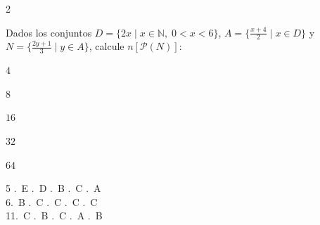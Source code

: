 \begin{multicols}{2}
\vspace{0.3cm}

\ejercicio Dados los conjuntos
$D = \{2x \mid x \in \mathbb{N},\; 0 < x < 6\}$,
$A = \bigl\{\tfrac{x+4}{2} \;\big|\; x \in D\bigr\}$ y
$N = \bigl\{\tfrac{2y+1}{3} \;\big|\; y \in A\bigr\}$,
calcule $n[\mathcal{P}(N)]$:
\begin{alternativas}
  \item $4$
  \item $8$
  \item $16$
  \item $32$
  \item $64$
\end{alternativas}

\end{multicols}

\vspace{0.5cm}
\begin{tcolorbox}[
  enhanced, colback=GrisClaro, colframe=GrisMedio,
  arc=2pt, boxrule=0.5pt,
  fonttitle=\sffamily\bfseries\small\color{GrisCarbón},
  title={Clave de Respuestas}
]
\small\sffamily
\begin{multicols}{5}
.~E .~D .~B .~C .~A \\
6.~B .~C .~C .~C .~C \\
11.~C .~B .~C .~A .~B
\end{multicols}
\end{tcolorbox}

